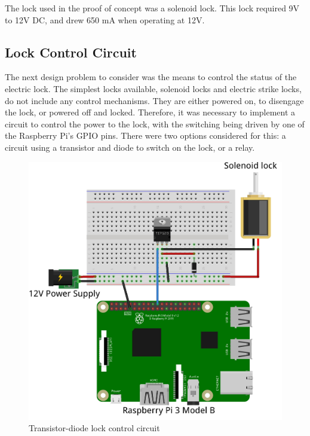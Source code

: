 \documentclass[12pt]{report}
\let\Oldsubsection\subsection
\renewcommand{\subsection}{\FloatBarrier\Oldsubsection}
\begin{document}
The lock used in the proof of concept was a solenoid lock. This lock required 9V to 12V DC, and drew 650 mA when 
operating at 12V.

\subsection{Lock Control Circuit} \label{lock-control-circuit}

The next design problem to consider was the means to control the status of the electric lock. The simplest locks 
available, solenoid locks and electric strike locks, do not include any control mechanisms. They are either powered on, 
to disengage the lock, or powered off and locked. Therefore, it was necessary to implement a circuit to control the
power to the lock, with the switching being driven by one of the Raspberry Pi's GPIO pins. There were two options
considered for this: a circuit using a transistor and diode to switch on the lock, or a relay.

\begin{figure}
    \includegraphics[width=\textwidth]{Diagrams/Hardware-Diagrams/diode_transistor_circuit}
    \caption{Transistor-diode lock control circuit}
    \label{fig:transistor-diode-circuit-diagram}
\end{figure}
\end{document}
